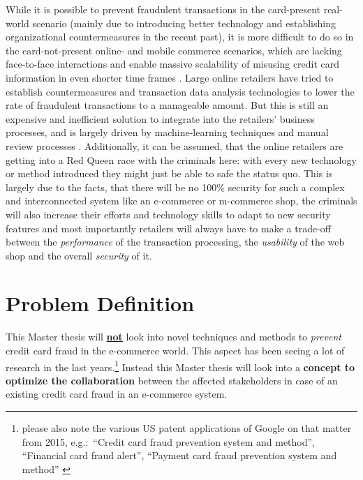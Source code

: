 While it is possible to prevent fraudulent transactions in the card-present real-world scenario (mainly due to introducing better technology and establishing organizational
countermeasures in the recent past), it is more difficult to do so in the card-not-present online- and mobile commerce scenarios, which are lacking face-to-face interactions
and enable massive scalability of misusing credit card information in even shorter time frames \citep{Lewis2015}. Large online retailers have tried to establish countermeasures
and transaction data analysis technologies to lower the rate of fraudulent transactions to a manageable amount. But this is still an expensive and inefficient solution to integrate
into the retailers’ business processes, and is largely driven by machine-learning techniques and manual review processes \citep{Brachmann2015}. Additionally, it can be assumed,
that the online retailers are getting into a Red Queen race with the criminals here: with every new technology or method introduced they might just be able to safe the status quo.
This is largely due to the facts, that there will be no 100\% security for such a complex and interconnected system like an e-commerce or m-commerce shop, the criminals will also
increase their efforts and technology skills to adapt to new security features and most importantly retailers will always have to make a trade-off between the \textit{performance}
of the transaction processing, the \textit{usability} of the web shop and the overall \textit{security} of it.


\section{Problem Definition}
\label{sec:problem_definition}

This Master thesis will \textbf{\underline{not}} look into novel techniques and methods to \textit{prevent} credit card fraud in the e-commerce world. This aspect has been seeing a lot of research
in the last years.\footnote{please also note the various US patent applications of Google on that matter from 2015, e.g.:\ “Credit card fraud prevention system and method”, “Financial card fraud alert”,
“Payment card fraud prevention system and method” \citep{GooglePatents2015}} Instead this Master thesis will look into a \textbf{concept to optimize the collaboration} between the affected stakeholders in case of an existing credit card fraud in an e-commerce system. \\

